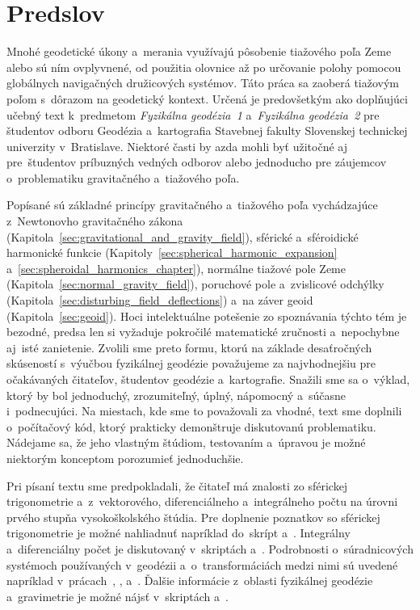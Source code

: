 \documentclass[a4paper, 12pt]{book}
\begin{document}

\chapter*{Predslov}

Mnohé geodetické úkony a~merania využívajú pôsobenie tiažového poľa Zeme alebo 
sú ním ovplyvnené, od použitia olovnice až po určovanie polohy pomocou 
globálnych navigačných družicových systémov.  Táto práca sa zaoberá tiažovým 
poľom s~dôrazom na geodetický kontext.  Určená je predovšetkým ako doplňujúci 
učebný text k~predmetom \emph{Fyzikálna geodézia~1} a~\emph{Fyzikálna 
geodézia~2} pre študentov odboru Geodézia a~kartografia Stavebnej fakulty 
Slovenskej technickej univerzity v~Bratislave.  Niektoré časti by azda mohli 
byť užitočné aj pre~študentov príbuzných vedných odborov alebo jednoducho pre 
záujemcov o~problematiku gravitačného a~tiažového poľa.

Popísané sú základné princípy gravitačného a~tiažového poľa vychádzajúce 
z~Newtonovho gravitačného zákona 
(Kapitola~\ref{sec:gravitational_and_gravity_field}), sférické a~sféroidické 
harmonické funkcie (Kapitoly~\ref{sec:spherical_harmonic_expansion} 
a~\ref{sec:spheroidal_harmonics_chapter}), normálne tiažové pole Zeme 
(Kapitola~\ref{sec:normal_gravity_field}), poruchové pole a~zvislicové odchýlky 
(Kapitola~\ref{sec:disturbing_field_deflections}) a~na záver geoid 
(Kapitola~\ref{sec:geoid}).  Hoci intelektuálne potešenie zo spoznávania týchto 
tém je bezodné, predsa len si vyžaduje pokročilé matematické zručnosti 
a~nepochybne aj~isté zanietenie.  Zvolili sme preto formu, ktorú na základe 
desaťročných skúseností s~výučbou fyzikálnej geodézie považujeme za 
najvhodnejšiu pre očakávaných čitateľov, študentov geodézie a~kartografie.  
Snažili sme sa o~výklad, ktorý by bol jednoduchý, zrozumiteľný, úplný, 
nápomocný a~súčasne i~podnecujúci.  Na miestach, kde sme to považovali za 
vhodné, text sme doplnili o~počítačový kód, ktorý prakticky demonštruje 
diskutovanú problematiku.  Nádejame sa, že jeho vlastným štúdiom, testovaním 
a~úpravou je možné niektorým konceptom porozumieť jednoduchšie.

Pri písaní textu sme predpokladali, že čitateľ má znalosti zo sférickej 
trigonometrie a~z~vektorového, diferenciálneho a~integrálneho počtu na úrovni 
prvého stupňa vysokoškolského štúdia.  Pre doplnenie poznatkov so sférickej 
trigonometrie je možné nahliadnuť napríklad do~skrípt \textcite{Husar2017} 
a~\textcite{Minarechova2019}.  Integrálny a~diferenciálny počet je diskutovaný 
v~skriptách \textcite{Minarechova2019} a~\textcite{Macak2021}.  Podrobnosti 
o~súradnicových systémoch používaných v~geodézii a~o~transformáciách medzi nimi 
sú uvedené napríklad v~prácach~\textcite{Melicher1993}, 
\textcite{Kostelecky2008}, \textcite{Melicher2009} a~\textcite{Husar2017}.  
Ďalšie informácie z~oblasti fyzikálnej geodézie a~gravimetrie je možné nájsť 
v~skriptách \textcite{Janak2006} a~\textcite{Janak2010}.
\end{document}
